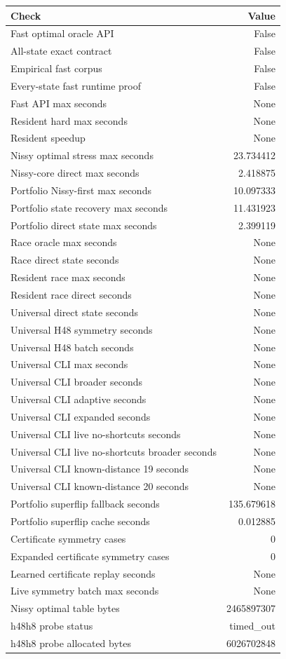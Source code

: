 {\small
\begin{tabular}{lr}
\hline
Check & Value \\
\hline
Fast optimal oracle API & False \\
All-state exact contract & False \\
Empirical fast corpus & False \\
Every-state fast runtime proof & False \\
Fast API max seconds & None \\
Resident hard max seconds & None \\
Resident speedup & None \\
Nissy optimal stress max seconds & 23.734412 \\
Nissy-core direct max seconds & 2.418875 \\
Portfolio Nissy-first max seconds & 10.097333 \\
Portfolio state recovery max seconds & 11.431923 \\
Portfolio direct state max seconds & 2.399119 \\
Race oracle max seconds & None \\
Race direct state seconds & None \\
Resident race max seconds & None \\
Resident race direct seconds & None \\
Universal direct state seconds & None \\
Universal H48 symmetry seconds & None \\
Universal H48 batch seconds & None \\
Universal CLI max seconds & None \\
Universal CLI broader seconds & None \\
Universal CLI adaptive seconds & None \\
Universal CLI expanded seconds & None \\
Universal CLI live no-shortcuts seconds & None \\
Universal CLI live no-shortcuts broader seconds & None \\
Universal CLI known-distance 19 seconds & None \\
Universal CLI known-distance 20 seconds & None \\
Portfolio superflip fallback seconds & 135.679618 \\
Portfolio superflip cache seconds & 0.012885 \\
Certificate symmetry cases & 0 \\
Expanded certificate symmetry cases & 0 \\
Learned certificate replay seconds & None \\
Live symmetry batch max seconds & None \\
Nissy optimal table bytes & 2465897307 \\
h48h8 probe status & timed\_out \\
h48h8 probe allocated bytes & 6026702848 \\
\hline
\end{tabular}
}

